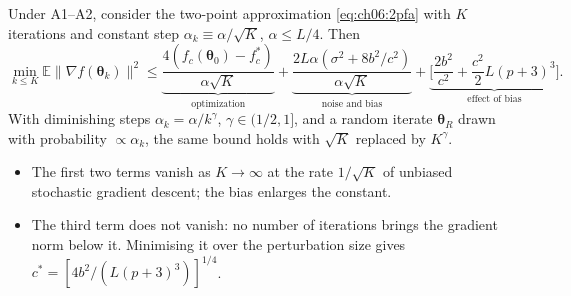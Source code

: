 \documentclass[handoutsbeamer.tex]{subfiles}
\begin{document}
\begin{frame}
\onp{\footnotesize}
\begin{thm}\label{thm:ch06:twopoint}
Under A1--A2, consider the two-point approximation \eqref{eq:ch06:2pfa} with $K$ iterations and constant step $\alpha_k \equiv \alpha/\sqrt K$, $\alpha \le L/4$. Then
\begin{equation}\label{eq:ch06:tp}
    \min_{k\le K}\mathbb E\|\nabla f(\boldsymbol\theta_k)\|^2 \le
    \underbrace{\frac{4(f_c(\boldsymbol\theta_0) - f_c^*)}{\alpha\sqrt K}}_{\text{optimization}}
    + \underbrace{\frac{2L\alpha(\sigma^2 + 8b^2/c^2)}{\alpha\sqrt K}}_{\text{noise and bias}}
    + \underbrace{\Big[\frac{2b^2}{c^2} + \frac{c^2}{2}L(p+3)^3\Big]}_{\text{effect of bias}}.
\end{equation}
With diminishing steps $\alpha_k = \alpha/k^\gamma$, $\gamma \in (1/2,1]$, and a random iterate $\boldsymbol\theta_R$ drawn with probability $\propto \alpha_k$, the same bound holds with $\sqrt K$ replaced by $K^\gamma$.
\end{thm}
\begin{itemize}\setlength\itemsep{0.2em}
    \item The first two terms vanish as $K \to \infty$ at the rate $1/\sqrt K$ of unbiased stochastic gradient descent; the bias enlarges the constant.
    \item The third term does not vanish: no number of iterations brings the gradient norm below it. Minimising it over the perturbation size gives $c^* = [4b^2/(L(p+3)^3)]^{1/4}$.
\end{itemize}
\end{frame}

\begin{frame}
\end{frame}
\end{document}
